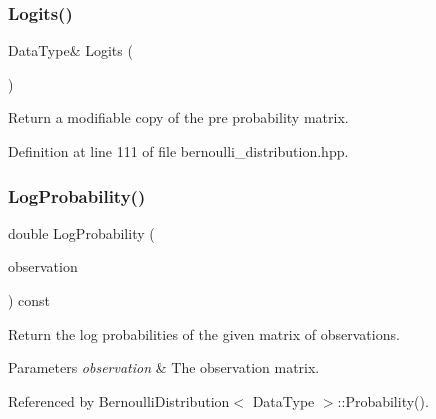 \mbox{\label{classmlpack_1_1ann_1_1BernoulliDistribution_a693726db71ae8d6dea2993305b8296e4}} 
\subsubsection{Logits()\hspace{0.1cm}{\footnotesize\ttfamily [2/2]}}
{\footnotesize\ttfamily Data\+Type\& Logits (\begin{DoxyParamCaption}{ }\end{DoxyParamCaption})\hspace{0.3cm}{\ttfamily [inline]}}



Return a modifiable copy of the pre probability matrix. 



Definition at line 111 of file bernoulli\+\_\+distribution.\+hpp.

\mbox{\label{classmlpack_1_1ann_1_1BernoulliDistribution_a1b59fa6b8ee989ff2d9b0a001309e792}} 
\subsubsection{Log\+Probability()}
{\footnotesize\ttfamily double Log\+Probability (\begin{DoxyParamCaption}\item[{const Data\+Type \&}]{observation }\end{DoxyParamCaption}) const}



Return the log probabilities of the given matrix of observations. 


\begin{DoxyParams}{Parameters}
{\em observation} & The observation matrix. \\
\hline
\end{DoxyParams}


Referenced by Bernoulli\+Distribution$<$ Data\+Type $>$\+::\+Probability().

\mbox{\label{classmlpack_1_1ann_1_1BernoulliDistribution_a73599ea85b4aa7a913286b6f62e40ccc}} 
